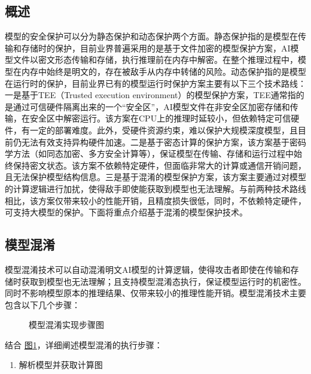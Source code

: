 \documentclass[letterpaper,10pt,english]{sphinxmanual}
\let\sphinxpxdimen\pdfpxdimen\else\newdimen\sphinxpxdimen
\begin{document}
\subsection{概述}
\label{\detokenize{chapter_model_deployment/model_security:id2}}
\sphinxAtStartPar
模型的安全保护可以分为静态保护和动态保护两个方面。静态保护指的是模型在传输和存储时的保护，目前业界普遍采用的是基于文件加密的模型保护方案，AI模型文件以密文形态传输和存储，执行推理前在内存中解密。在整个推理过程中，模型在内存中始终是明文的，存在被敌手从内存中转储的风险。动态保护指的是模型在运行时的保护，目前业界已有的模型运行时保护方案主要有以下三个技术路线：一是基于TEE（Trusted
execution
environment）的模型保护方案，TEE通常指的是通过可信硬件隔离出来的一个“安全区”，AI模型文件在非安全区加密存储和传输，在安全区中解密运行。该方案在CPU上的推理时延较小，但依赖特定可信硬件，有一定的部署难度。此外，受硬件资源约束，难以保护大规模深度模型，且目前仍无法有效支持异构硬件加速。二是基于密态计算的保护方案，该方案基于密码学方法（如同态加密、多方安全计算等），保证模型在传输、存储和运行过程中始终保持密文状态。该方案不依赖特定硬件，但面临非常大的计算或通信开销问题，且无法保护模型结构信息。三是基于混淆的模型保护方案，该方案主要通过对模型的计算逻辑进行加扰，使得敌手即使能获取到模型也无法理解。与前两种技术路线相比，该方案仅带来较小的性能开销，且精度损失很低，同时，不依赖特定硬件，可支持大模型的保护。下面将重点介绍基于混淆的模型保护技术。


\subsection{模型混淆}
\label{\detokenize{chapter_model_deployment/model_security:id3}}
\sphinxAtStartPar
模型混淆技术可以自动混淆明文AI模型的计算逻辑，使得攻击者即使在传输和存储时获取到模型也无法理解；且支持模型混淆态执行，保证模型运行时的机密性。同时不影响模型原本的推理结果、仅带来较小的推理性能开销。模型混淆技术主要包含以下几个步骤：

\begin{figure}[H]
\centering
\capstart

\noindent\sphinxincludegraphics[width=400\sphinxpxdimen]{{model_obfuscate}.png}
\caption{模型混淆实现步骤图}\label{\detokenize{chapter_model_deployment/model_security:id4}}\label{\detokenize{chapter_model_deployment/model_security:ch08-fig-model-obfuscate}}\end{figure}

\sphinxAtStartPar
结合
\hyperref[\detokenize{chapter_model_deployment/model_security:ch08-fig-model-obfuscate}]{图\ref{\detokenize{chapter_model_deployment/model_security:ch08-fig-model-obfuscate}}}，详细阐述模型混淆的执行步骤：
\begin{enumerate}
%
\item {} 
\sphinxAtStartPar
解析模型并获取计算图

\end{enumerate}
\end{document}
